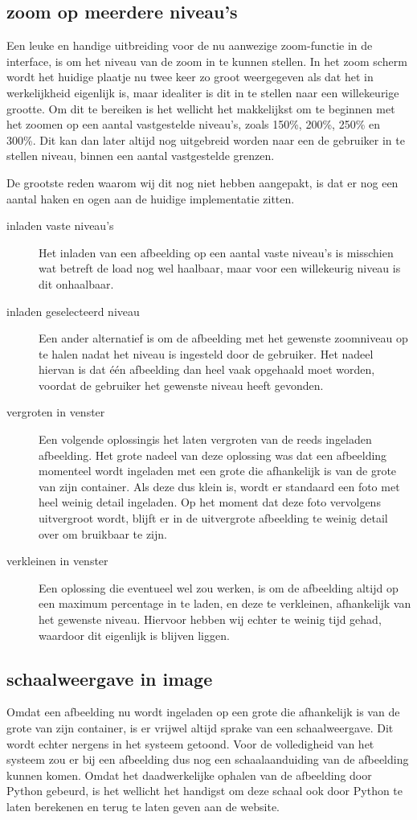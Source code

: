 \subsection{zoom op meerdere niveau's}
Een leuke en handige uitbreiding voor de nu aanwezige zoom-functie in de interface, is om het niveau van de zoom in te kunnen stellen.
In het zoom scherm wordt het huidige plaatje nu twee keer zo groot weergegeven als dat het in werkelijkheid eigenlijk is, maar idealiter is dit in te stellen naar een willekeurige grootte.
Om dit te bereiken is het wellicht het makkelijkst om te beginnen met het zoomen op een aantal vastgestelde niveau's, zoals 150\%, 200\%, 250\% en 300\%.
Dit kan dan later altijd nog uitgebreid worden naar een de gebruiker in te stellen niveau, binnen een aantal vastgestelde grenzen.

De grootste reden waarom wij dit nog niet hebben aangepakt, is dat er nog een aantal haken en ogen aan de huidige implementatie zitten.
\begin{description}
	\item[inladen vaste niveau's] Het inladen van een afbeelding op een aantal vaste niveau's is misschien wat betreft de load nog wel haalbaar, maar voor een willekeurig niveau is dit onhaalbaar.
	\item[inladen geselecteerd niveau] Een ander alternatief is om de afbeelding met het gewenste zoomniveau op te halen nadat het niveau is ingesteld door de gebruiker.
	Het nadeel hiervan is dat \'{e}\'{e}n afbeelding dan heel vaak opgehaald moet worden, voordat de gebruiker het gewenste niveau heeft gevonden.
	\item[vergroten in venster] Een volgende oplossingis het laten vergroten van de reeds ingeladen afbeelding.
	Het grote nadeel van deze oplossing was dat een afbeelding momenteel wordt ingeladen met een grote die afhankelijk is van de grote van zijn container.
Als deze dus klein is, wordt er standaard een foto met heel weinig detail ingeladen.
Op het moment dat deze foto vervolgens uitvergroot wordt, blijft er in de uitvergrote afbeelding te weinig detail over om bruikbaar te zijn.
	\item[verkleinen in venster] Een oplossing die eventueel wel zou werken, is om de afbeelding altijd op een maximum percentage in te laden, en deze te verkleinen, afhankelijk van het gewenste niveau.
Hiervoor hebben wij echter te weinig tijd gehad, waardoor dit eigenlijk is blijven liggen.
\end{description}

\subsection{schaalweergave in image}
Omdat een afbeelding nu wordt ingeladen op een grote die afhankelijk is van de grote van zijn container, is er vrijwel altijd sprake van een schaalweergave.
Dit wordt echter nergens in het systeem getoond.
Voor de volledigheid van het systeem zou er  bij een afbeelding dus nog een schaalaanduiding van de afbeelding kunnen komen.
Omdat het daadwerkelijke ophalen van de afbeelding door Python gebeurd, is het wellicht het handigst om deze schaal ook door Python te laten berekenen en terug te laten geven aan de website.

